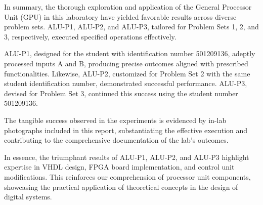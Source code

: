 

{In summary, the thorough exploration and application of the General Processor Unit (GPU) in this laboratory have yielded favorable results across diverse problem sets. ALU-P1, ALU-P2, and ALU-P3, tailored for Problem Sets 1, 2, and 3, respectively, executed specified operations effectively.}

{ALU-P1, designed for the student with identification number 501209136, adeptly processed inputs A and B, producing precise outcomes aligned with prescribed functionalities. Likewise, ALU-P2, customized for Problem Set 2 with the same student identification number, demonstrated successful performance. ALU-P3, devised for Problem Set 3, continued this success using the student number 501209136.}

{The tangible success observed in the experiments is evidenced by in-lab photographs included in this report, substantiating the effective execution and contributing to the comprehensive documentation of the lab's outcomes.}

{In essence, the triumphant results of ALU-P1, ALU-P2, and ALU-P3 highlight expertise in VHDL design, FPGA board implementation, and control unit modifications. This reinforces our comprehension of processor unit components, showcasing the practical application of theoretical concepts in the design of digital systems.}

{}

{}

{}

{}

{}

{}

{}

{}

{}

{}


